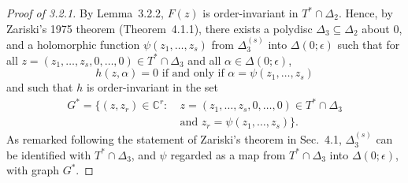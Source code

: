 \documentclass[11pt]{article}
\theoremstyle{plain}
\theoremstyle{definition}
\newcommand{\C}{\mathbb{C}}
\begin{document}
\begin{proof}[Proof of 3.2.1]
By Lemma~3.2.2, $F(z)$ is order-invariant in $T^* \cap \Delta_2$.
Hence, by Zariski's 1975 theorem (Theorem~4.1.1), there exists a
polydisc $\Delta_3 \subseteq \Delta_2$ about $0$, and a holomorphic
function $\psi(z_1, \ldots, z_s)$ from $\Delta_3^{(s)}$ into
$\Delta(0; \epsilon)$ such that for all
$z = (z_1, \ldots, z_s, 0, \ldots, 0) \in T^* \cap \Delta_3$ and all
$\alpha \in \Delta(0; \epsilon)$,
\begin{equation}
h(z, \alpha) = 0 \text{ if and only if } \alpha = \psi(z_1, \ldots, z_s) \tag{3.3.9}
\end{equation}
and such that $h$ is order-invariant in the set
\[
\begin{aligned}
G^* = \{ (z, z_r) \in \C^r :\
&z = (z_1, \ldots, z_s, 0, \ldots, 0) \in T^* \cap \Delta_3 \\
&\text{and } z_r = \psi(z_1, \ldots, z_s) \}.
\end{aligned}
\]
As remarked following the statement of Zariski's theorem in Sec.~4.1,
$\Delta_3^{(s)}$ can be identified with $T^* \cap \Delta_3$, and
$\psi$ regarded as a map from $T^* \cap \Delta_3$ into
$\Delta(0; \epsilon)$, with graph $G^*$.


\end{proof}
\end{document}
